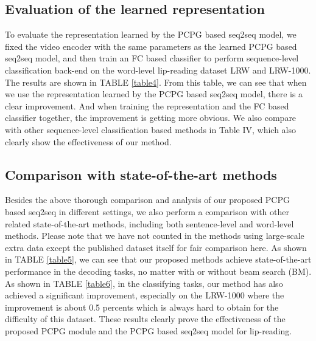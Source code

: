 \documentclass[a4paper, 10pt, conference]{ieeeconf}      \usepackage{FG2020}
\begin{document}
\subsection{Evaluation of the learned representation}
To evaluate the representation learned by the PCPG based seq2seq model, we fixed the video encoder with the same parameters as the learned PCPG based seq2seq model, and then train an FC based classifier to perform sequence-level classification back-end on the word-level lip-reading dataset LRW and LRW-1000. The results are shown in TABLE \ref{table4}. From this table, we can see that when we use the representation learned by the PCPG based seq2seq model, there is a clear improvement. And when training the representation and the FC based classifier together, the improvement is getting more obvious. We also compare with other sequence-level classification based methods in Table IV, which also clearly show the effectiveness of our method.

\subsection{Comparison with state-of-the-art  methods}
Besides the above thorough comparison and analysis of our proposed PCPG based seq2seq in different settings, we also perform a comparison with other related state-of-the-art methods, including both sentence-level and word-level methods. Please note that we have not counted in the methods using large-scale extra data except the published dataset itself for fair comparison here. As shown in TABLE \ref{table5},  we can see that our proposed methods achieve state-of-the-art performance in the decoding tasks, no matter with or without beam search (BM). As shown in  TABLE \ref{table6}, in the classifying tasks, our method has also achieved a significant improvement, especially on the LRW-1000 where the improvement is about 0.5 percents which is always hard to obtain for the difficulty of this dataset. These results clearly prove the effectiveness of the proposed PCPG module and the PCPG based seq2seq model for lip-reading.
\end{document}
